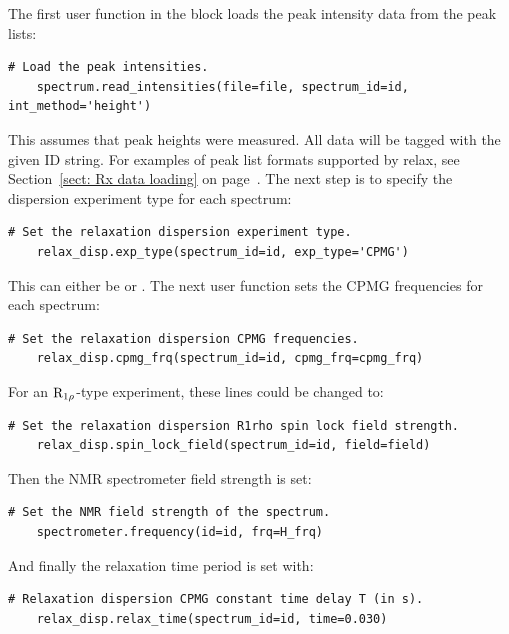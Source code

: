 The first user function in the block loads the peak intensity data from the peak lists:

\begin{lstlisting}[firstnumber=96]
    # Load the peak intensities.
    spectrum.read_intensities(file=file, spectrum_id=id, int_method='height')
\end{lstlisting}

This assumes that peak heights were measured.  All data will be tagged with the given ID string.  For examples of peak list formats supported by relax, see Section~\ref{sect: Rx data loading} on page~\pageref{sect: Rx data loading}.
The next step is to specify the dispersion experiment type for each spectrum:

\begin{lstlisting}[firstnumber=99]
    # Set the relaxation dispersion experiment type.
    relax_disp.exp_type(spectrum_id=id, exp_type='CPMG')
\end{lstlisting}

This can either be  or .
The next user function sets the CPMG frequencies for each spectrum:

\begin{lstlisting}[firstnumber=102]
    # Set the relaxation dispersion CPMG frequencies.
    relax_disp.cpmg_frq(spectrum_id=id, cpmg_frq=cpmg_frq)
\end{lstlisting}

For an $\mathrm{R}_{1\rho}$-type experiment, these lines could be changed to:

\begin{lstlisting}[numbers=none]
    # Set the relaxation dispersion R1rho spin lock field strength.
    relax_disp.spin_lock_field(spectrum_id=id, field=field)
\end{lstlisting}

Then the NMR spectrometer field strength is set:

\begin{lstlisting}[firstnumber=105]
    # Set the NMR field strength of the spectrum.
    spectrometer.frequency(id=id, frq=H_frq)
\end{lstlisting}

And finally the relaxation time period is set with:

\begin{lstlisting}[firstnumber=108]
    # Relaxation dispersion CPMG constant time delay T (in s).
    relax_disp.relax_time(spectrum_id=id, time=0.030)
\end{lstlisting}

